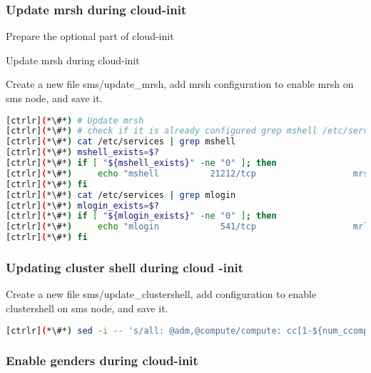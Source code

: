 \subsubsection{Update mrsh during cloud-init}

	Prepare the optional part of cloud-init

	Update mrsh during cloud-init 
 
	Create a new file sms/update\_mrsh, add mrsh configuration to enable mrsh on sms node, and save it. 


\begin{lstlisting}[language=bash,keywords={}]
[ctrlr](*\#*) # Update mrsh
[ctrlr](*\#*) # check if it is already configured grep mshell /etc/services will return non-zero, else configure"
[ctrlr](*\#*) cat /etc/services | grep mshell
[ctrlr](*\#*) mshell_exists=$?
[ctrlr](*\#*) if [ "${mshell_exists}" -ne "0" ]; then
[ctrlr](*\#*)     echo "mshell          21212/tcp                   mrshd" >> /etc/services
[ctrlr](*\#*) fi
[ctrlr](*\#*) cat /etc/services | grep mlogin
[ctrlr](*\#*) mlogin_exists=$?
[ctrlr](*\#*) if [ "${mlogin_exists}" -ne "0" ]; then
[ctrlr](*\#*)     echo "mlogin            541/tcp                   mrlogind" >> /etc/services
[ctrlr](*\#*) fi
\end{lstlisting} 


\subsubsection{Updating cluster shell during cloud -init}
	
	Create a new file sms/update\_clustershell, add configuration to enable clustershell on sms node, and save it. 


\begin{lstlisting}[language=bash,keywords={}]
[ctrlr](*\#*) sed -i -- 's/all: @adm,@compute/compute: cc[1-${num_ccomputes}]\n&/' /etc/clustershell/groups.d/local.cfg
\end{lstlisting} 
 
 \subsubsection{Enable genders during cloud-init}
	
